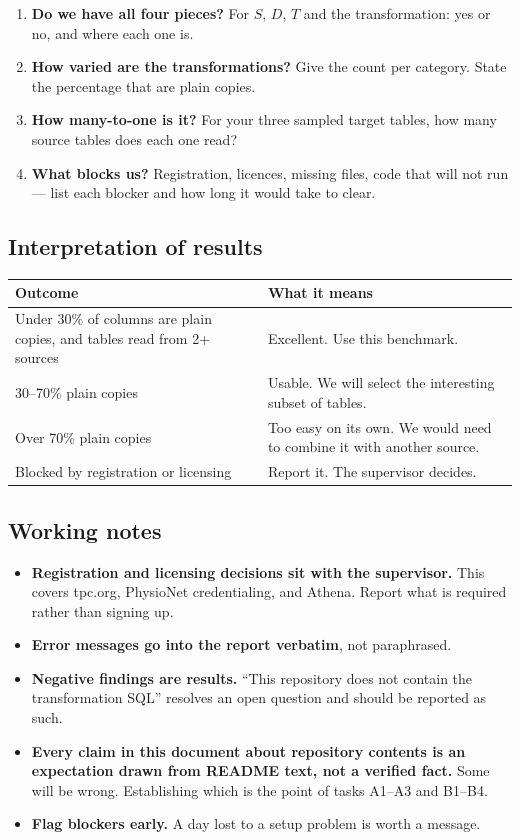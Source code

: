 \documentclass[11pt,a4paper]{article}
\begin{document}
\begin{enumerate}
\item \textbf{Do we have all four pieces?} For $S$, $D$, $T$ and the transformation:
  yes or no, and where each one is.
\item \textbf{How varied are the transformations?} Give the count per category. State the
  percentage that are plain copies.
\item \textbf{How many-to-one is it?} For your three sampled target tables, how many
  source tables does each one read?
\item \textbf{What blocks us?} Registration, licences, missing files, code that will not
  run --- list each blocker and how long it would take to clear.
\end{enumerate}

\subsection{Interpretation of results}

\begin{center}
\begin{tabular}{@{}L{5.6cm}L{9.6cm}@{}}
\toprule
\textbf{Outcome} & \textbf{What it means} \\
\midrule
Under 30\% of columns are plain copies, and tables read from 2+ sources & Excellent. Use this benchmark. \\
30--70\% plain copies & Usable. We will select the interesting subset of tables. \\
Over 70\% plain copies & Too easy on its own. We would need to combine it with another source. \\
Blocked by registration or licensing & Report it. The supervisor decides. \\
\bottomrule
\end{tabular}
\end{center}

\subsection{Working notes}

\begin{itemize}
\item \textbf{Registration and licensing decisions sit with the supervisor.} This covers
  tpc.org, PhysioNet credentialing, and Athena. Report what is required rather than
  signing up.
\item \textbf{Error messages go into the report verbatim}, not paraphrased.
\item \textbf{Negative findings are results.} ``This repository does not contain the
  transformation SQL'' resolves an open question and should be reported as such.
\item \textbf{Every claim in this document about repository contents is an expectation
  drawn from README text, not a verified fact.} Some will be wrong. Establishing which is
  the point of tasks A1--A3 and B1--B4.
\item \textbf{Flag blockers early.} A day lost to a setup problem is worth a message.
\end{itemize}
\end{document}
